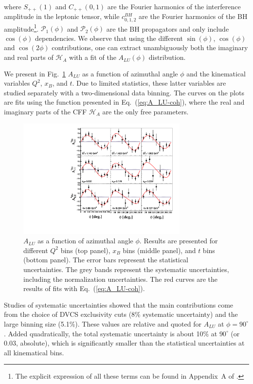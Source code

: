 \documentclass[twocolumn,nofootinbib,showpacs,prl,superscriptaddress,secnumarabic,amssymb,nobibnotes,aps,floatfix]{revtex4}
\begin{document}
where $S_{++}(1)$ and $C_{++}(0,1)$ are the Fourier harmonics of the 
interference amplitude in the leptonic tensor, while $c_{0,1,2}^{BH}$ 
are the Fourier harmonics of the BH amplitude\footnote{The explicit 
expression of all these terms can be found in Appendix~A of \cite{Armstrong:2017wfw}.}.
${\mathcal P}_1(\phi)$ and ${\mathcal P}_2(\phi)$ are the BH
propagators and only include $\cos(\phi)$ dependencies.
We observe that using the different $\sin(\phi)$, $\cos(\phi)$ and $\cos(2\phi)$ contributions, 
one can extract unambiguously both the imaginary and real parts of $\mathcal{H}_{A}$
with a fit of the $A_{LU}(\phi)$ distribution.

We present in Fig.~\ref{fig:alu} $A_{LU}$ as a function of azimuthal angle 
$\phi$ and the kinematical variables $Q^2$, $x_B$, and $t$. Due to limited 
statistics, these latter variables are studied separately with a two-dimensional 
data binning. The curves on 
the plots are fits using the function presented in Eq.~(\ref{eq:A_LU-coh}), 
where the real and imaginary parts of the CFF $\mathcal{H}_{A}$ are the only 
free parameters. 

\begin{figure}[tb]
   \centering
\includegraphics[width=8.5cm]{F_Coherent_ALU_phi.pdf}
\caption{$A_{LU}$ as a function of azimuthal angle $\phi$. Results are presented
   for different $Q^{2}$ bins (top panel), $x_{B}$ bins (middle panel), and $t$ 
   bins (bottom panel).  The error bars represent the statistical 
   uncertainties. The grey bands represent the systematic uncertainties, 
   including the normalization uncertainties. The red curves are the results of 
   fits with Eq.~(\ref{eq:A_LU-coh}).}
\label{fig:alu}
\end{figure}

Studies of systematic uncertainties showed that the main contributions 
come from the choice of DVCS exclusivity cuts (8\% systematic uncertainty) and the 
large binning size (5.1\%). These values are relative and quoted for $A_{LU}$
at $\phi=90^\circ$. Added quadratically, the total systematic uncertainty
is about 10\% at $90^\circ$ (or 0.03, absolute), which is significantly smaller
than the statistical uncertainties at all kinematical bins. 
\end{document}

